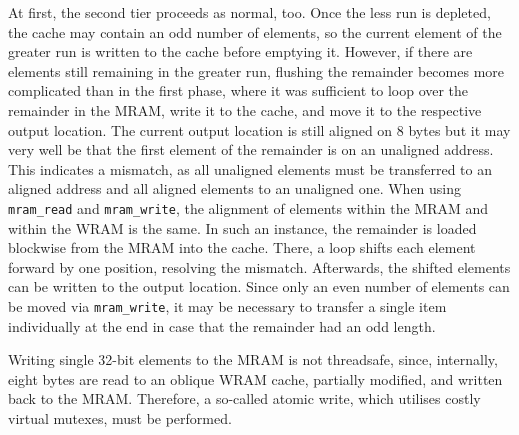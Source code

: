 At first, the second tier proceeds as normal, too.
Once the less run is depleted, the cache may contain an odd number of elements, so the current element of the greater run is written to the cache before emptying it.
However, if there are elements still remaining in the greater run, flushing the remainder becomes more complicated than in the first phase, where it was sufficient to loop over the remainder in the MRAM, write it to the cache, and move it to the respective output location.
The current output location is still aligned on 8 bytes but it may very well be that the first element of the remainder is on an unaligned address.
This indicates a mismatch, as all unaligned elements must be transferred to an aligned address and all aligned elements to an unaligned one.
When using \lstinline|mram_read| and \lstinline|mram_write|, the alignment of elements within the MRAM and within the WRAM is the same.
In such an instance, the remainder is loaded blockwise from the MRAM into the cache.
There, a loop shifts each element forward by one position, resolving the mismatch.
Afterwards, the shifted elements can be written to the output location.
Since only an even number of elements can be moved via \lstinline|mram_write|, it may be necessary to transfer a single item individually at the end in case that the remainder had an odd length.

Writing single 32-bit elements to the MRAM is not threadsafe, since, internally, eight bytes are read to an oblique WRAM cache, partially modified, and written back to the MRAM.
Therefore, a so-called atomic write, which utilises costly virtual mutexes, must be performed.





